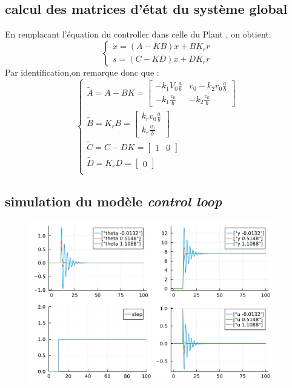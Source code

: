 \documentclass[11pt,a4paper]{article}
\begin{document}
\subsection{calcul des matrices d'état du système global}
En remplacant l'équation du controller dans celle du Plant , on obtient:
\begin{equation}
	\begin{cases}
		\dot x= (A-KB)x+BK_rr \\
		s= (C-KD)x+DK_rr
	\end{cases}
\end{equation}
Par identification,on remarque donc que : \\
\begin{equation}
	\begin{cases}
		\tilde{A} = A-BK= \begin{bmatrix} - k_1 V_0 \frac ab & v_0 - k_2v_0 \frac ab \\ -k_1 \frac {v_0} b & -k_2 \frac{v_0}b \end{bmatrix} \\
		\tilde{B} = K_rB= \begin{bmatrix} k_r v_0 \frac ab \\  k_r \frac{v_0}b \end{bmatrix}                                                \\
		\tilde{C} = C-DK= \begin{bmatrix} 1 & 0  \end{bmatrix}                                                                              \\
		\tilde{D} = K_rD = \begin{bmatrix}  0  \end{bmatrix}                                                                                \\
	\end{cases}
\end{equation}
\subsection{simulation du modèle \textit{control loop}}
\begin{figure}[!h]
  \includegraphics[width=0.95\textwidth]{../code/jlplots/Q2_3.pdf}
\end{figure}
\end{document}
